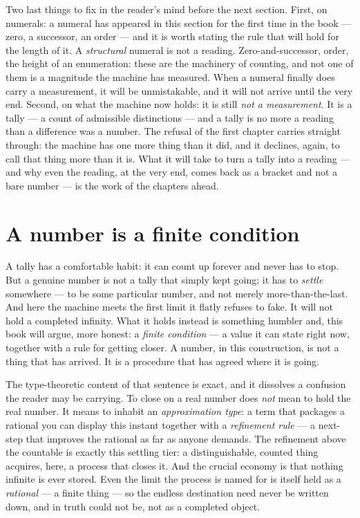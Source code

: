 Two last things to fix in the reader's mind before the next section. First, on numerals: a numeral has appeared in
this section for the first time in the book --- zero, a successor, an order --- and it is worth stating the rule that
will hold for the length of it. A \emph{structural} numeral is not a reading. Zero-and-successor, order, the height of
an enumeration: these are the machinery of counting, and not one of them is a magnitude the machine has measured. When
a numeral finally does carry a measurement, it will be unmistakable, and it will not arrive until the very end.
Second, on what the machine now holds: it is still \emph{not a measurement}. It is a tally --- a count of admissible
distinctions --- and a tally is no more a reading than a difference was a number. The refusal of the first chapter
carries straight through: the machine has one more thing than it did, and it declines, again, to call that thing more
than it is. What it will take to turn a tally into a reading --- and why even the reading, at the very end, comes back
as a bracket and not a bare number --- is the work of the chapters ahead.

\section{A number is a finite condition}

A tally has a comfortable habit: it can count up forever and never has to stop. But a genuine number is not a tally
that simply kept going; it has to \emph{settle} somewhere --- to be some particular number, and not merely
more-than-the-last. And here the machine meets the first limit it flatly refuses to fake. It will not hold a completed
infinity. What it holds instead is something humbler and, this book will argue, more honest: a \emph{finite condition}
--- a value it can state right now, together with a rule for getting closer. A number, in this construction, is not a
thing that has arrived. It is a procedure that has agreed where it is going.

The type-theoretic content of that sentence is exact, and it dissolves a confusion the reader may be carrying. To
close on a real number does \emph{not} mean to hold the real number. It means to inhabit an \emph{approximation type}:
a term that packages a rational you can display this instant together with a \emph{refinement rule} --- a next-step
that improves the rational as far as anyone demands. The refinement above the countable is exactly this settling tier:
a distinguishable, counted thing acquires, here, a process that closes it. And the crucial economy is that nothing
infinite is ever stored. Even the limit the process is named for is itself held as a \emph{rational} --- a finite
thing --- so the endless destination need never be written down, and in truth could not be, not as a completed object.

